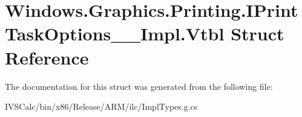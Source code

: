 \hypertarget{struct_windows_1_1_graphics_1_1_printing_1_1_i_print_task_options_____impl_1_1_vtbl}{}\section{Windows.\+Graphics.\+Printing.\+I\+Print\+Task\+Options\+\_\+\+\_\+\+Impl.\+Vtbl Struct Reference}
\label{struct_windows_1_1_graphics_1_1_printing_1_1_i_print_task_options_____impl_1_1_vtbl}


The documentation for this struct was generated from the following file\+:\begin{DoxyCompactItemize}
\item 
I\+V\+S\+Calc/bin/x86/\+Release/\+A\+R\+M/ilc/Impl\+Types.\+g.\+cs\end{DoxyCompactItemize}
